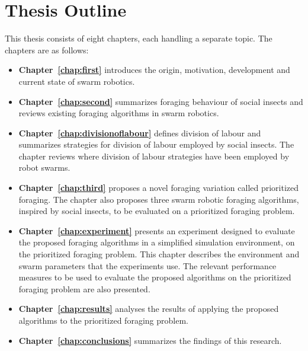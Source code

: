 
\section{Thesis Outline}
\label{sec:introduction:outline}
This thesis consists of eight chapters, each handling a separate topic. The chapters are as follows:

\begin{itemize}
\item\textbf{Chapter~\ref{chap:first}} introduces the origin, motivation, development and current state of swarm robotics.

\item\textbf{Chapter~\ref{chap:second}} summarizes foraging behaviour of social insects and reviews existing foraging algorithms in swarm robotics.

\item\textbf{Chapter~\ref{chap:divisionoflabour}} defines division of labour and summarizes strategies for division of labour employed by social insects. The chapter reviews where division of labour strategies have been employed by robot swarms.

\item\textbf{Chapter~\ref{chap:third}} proposes a novel foraging variation called prioritized foraging. The chapter also proposes three swarm robotic foraging algorithms, inspired by social insects, to be evaluated on a prioritized foraging problem.

\item\textbf{Chapter~\ref{chap:experiment}} presents an experiment designed to evaluate the proposed foraging algorithms in a simplified simulation environment, on the prioritized foraging problem. This chapter describes the environment and swarm parameters that the experiments use. The relevant performance measures to be used to evaluate the proposed algorithms on the prioritized foraging problem are also presented.

\item\textbf{Chapter~\ref{chap:results}} analyses the results of applying the proposed algorithms to the prioritized foraging problem.

\item\textbf{Chapter~\ref{chap:conclusions}} summarizes the findings of this research.

\end{itemize}

